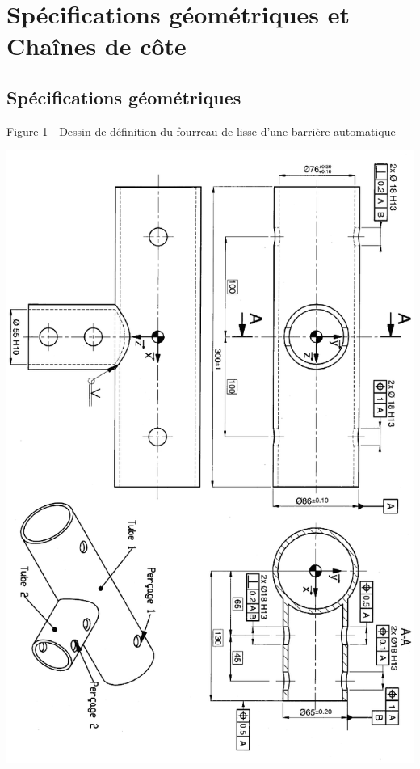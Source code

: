 \chapter{Spécifications géométriques et Chaînes de côte}
\thispagestyle{plain} %
\newpage


\section{Spécifications géométriques}

Figure 1 - Dessin de définition du fourreau de lisse d'une barrière automatique
\begin{center}
    \includegraphics[scale=0.5]{png/tube.png}
\end{center}
\newpage

